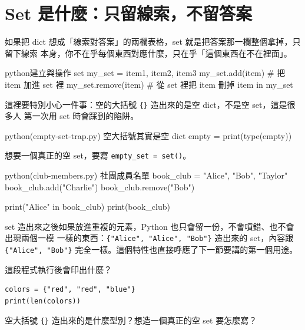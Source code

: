 \section{Set 是什麼：只留線索，不留答案}
\label{sec:set-basics}

如果把 dict 想成「線索對答案」的兩欄表格，set 就是把答案那一欄整個拿掉，只留下線索
本身，你不在乎每個東西對應什麼，只在乎「這個東西在不在裡面」。

\begin{code}{python}{建立與操作 set}
my_set = {item1, item2, item3}
my_set.add(item)      # 把 item 加進 set 裡
my_set.remove(item)   # 從 set 裡把 item 刪掉
item in my_set
\end{code}

這裡要特別小心一件事：空的大括號 \texttt{\{\}} 造出來的是空 dict，不是空 set，這是很多人
第一次用 set 時會踩到的陷阱。

\begin{example}{python}{(empty-set-trap.py) 空大括號其實是空 dict}
empty = {}
print(type(empty))
\end{example}


想要一個真正的空 set，要寫 \texttt{empty\_set = set()}。

\begin{example}{python}{(club-members.py) 社團成員名單}
book_club = {"Alice", "Bob", "Taylor"}
book_club.add("Charlie")
book_club.remove("Bob")

print("Alice" in book_club)
print(book_club)
\end{example}



set 造出來之後如果放進重複的元素，Python 也只會留一份，不會噴錯、也不會出現兩個一模
一樣的東西：\texttt{\{"Alice", "Alice", "Bob"\}} 造出來的 set，內容跟
\texttt{\{"Alice", "Bob"\}} 完全一樣。這個特性也直接呼應了下一節要講的第一個用途。

\begin{drills}[label=drills:set-basics]
\item 這段程式執行後會印出什麼？
\begin{verbatim}
colors = {"red", "red", "blue"}
print(len(colors))
\end{verbatim}
\item 空大括號 \texttt{\{\}} 造出來的是什麼型別？想造一個真正的空 set 要怎麼寫？
\end{drills}


